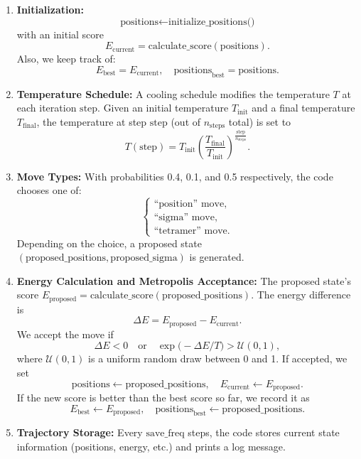 \documentclass[12pt]{article}
\begin{document}
\begin{enumerate}
    \item \textbf{Initialization:} 
    \[
      \text{positions} \gets \text{initialize\_positions()}
    \]
    with an initial score 
    \[
      E_{\text{current}} = \text{calculate\_score}(\text{positions}).
    \]
    Also, we keep track of:
    \[
      E_{\text{best}} = E_{\text{current}}, \quad \text{positions}_{\text{best}} = \text{positions}.
    \]
    \item \textbf{Temperature Schedule:} A cooling schedule modifies the temperature \(T\) at each iteration \(\text{step}\). Given an initial temperature \(T_{\text{init}}\) and a final temperature \(T_{\text{final}}\), the temperature at step \(\text{step}\) (out of \(n_{\text{steps}}\) total) is set to
    \[
      T(\text{step}) = T_{\text{init}} \left(\frac{T_{\text{final}}}{T_{\text{init}}}\right)^{\frac{\text{step}}{n_{\text{steps}}}}.
    \]
    \item \textbf{Move Types:} With probabilities 0.4, 0.1, and 0.5 respectively, the code chooses one of:
    \[
      \begin{cases}
      \text{``position'' move},\\
      \text{``sigma'' move},\\
      \text{``tetramer'' move}.
      \end{cases}
    \]
    Depending on the choice, a proposed state \((\text{proposed\_positions}, \text{proposed\_sigma})\) is generated.

    \item \textbf{Energy Calculation and Metropolis Acceptance:} 
    The proposed state's score \(E_{\text{proposed}} = \text{calculate\_score}(\text{proposed\_positions})\). The energy difference is
    \[
      \Delta E = E_{\text{proposed}} - E_{\text{current}}.
    \]
    We accept the move if 
    \[
      \Delta E < 0 \quad \text{or} \quad \exp\!\bigl(-\Delta E / T\bigr) > \mathcal{U}(0,1),
    \]
    where \(\mathcal{U}(0,1)\) is a uniform random draw between 0 and 1. If accepted, we set
    \[
      \text{positions} \gets \text{proposed\_positions}, \quad E_{\text{current}} \gets E_{\text{proposed}}.
    \]
    If the new score is better than the best score so far, we record it as 
    \[
      E_{\text{best}} \gets E_{\text{proposed}}, \quad \text{positions}_{\text{best}} \gets \text{proposed\_positions}.
    \]

    \item \textbf{Trajectory Storage:} Every \(\text{save\_freq}\) steps, the code stores current state information (positions, energy, etc.) and prints a log message.

\end{enumerate}
\end{document}
